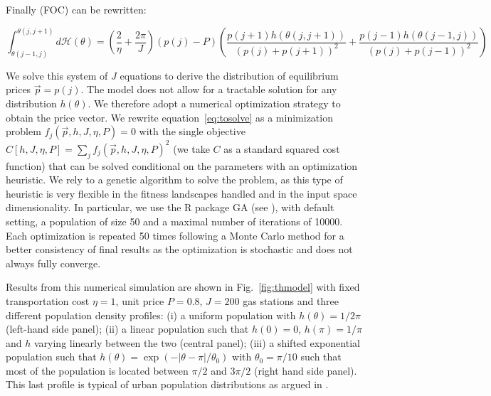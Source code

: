 \documentclass[10pt]{article}
\begin{document}
Finally (FOC) can be rewritten:

\begin{equation}
\label{eq:tosolve}
\int_{\theta(j-1, j)}^{\theta(j, j+1)}{ d\mathcal{H}(\theta)} = \left(\frac{2}{\eta} +\frac{2\pi}{J}\right)(p(j)-P)\left(\frac{p(j+1)h(\theta(j,j+1))}{\left(p(j)+p(j+1)\right)^2} +  \frac{p(j-1)h(\theta(j-1,j))}{\left(p(j)+p(j-1)\right)^2}\right)
\end{equation}

We solve this system of $J$ equations to derive the distribution of equilibrium prices $\vec{p} = p(j)$. The model does not allow for a tractable solution for any distribution $h(\theta)$. We therefore adopt a numerical optimization strategy to obtain the price vector. We rewrite equation~\ref{eq:tosolve} as a minimization problem $f_j(\vec{p},h,J,\eta,P) = 0$ with the single objective $C\left[h,J,\eta,P\right] = \sum_j f_j(\vec{p},h,J,\eta,P)^2$ (we take $C$ as a standard squared cost function) that can be solved conditional on the parameters with an optimization heuristic. We rely to a genetic algorithm to solve the problem, as this type of heuristic is very flexible in the fitness landscapes handled and in the input space dimensionality. In particular, we use the R package GA (see \citealp{Scrucca2013ga}), with default setting, a population of size 50 and a maximal number of iterations of 10000. Each optimization is repeated 50 times following a Monte Carlo method for a better consistency of final results as the optimization is stochastic and does not always fully converge.

Results from this numerical simulation are shown in Fig.~\ref{fig:thmodel} with fixed transportation cost $\eta = 1$, unit price $P=0.8$, $J=200$ gas stations and three different population density profiles: (i) a uniform population with $h(\theta) = 1 / 2\pi$ (left-hand side panel); (ii) a linear population such that $h(0)=0$, $h(\pi)=1 / \pi$ and $h$ varying linearly between the two (central panel); (iii) a shifted exponential population such that $h(\theta)=\exp ( - \left| \theta - \pi \right| / \theta_0)$ with $\theta_0 = \pi / 10$ such that most of the population is located between $\pi / 2$ and $3 \pi / 2$ (right hand side panel). This last profile is typical of urban population distributions as argued in \citet{anas1998urban}.
\end{document}
